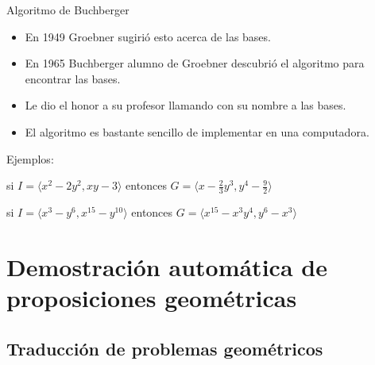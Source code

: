\documentclass[10pt]{beamer}
\newcommand{\gen}[1]{\ensuremath{\langle #1\rangle}}
\begin{document}
\begin{frame}{Algoritmo de Buchberger}
	\begin{itemize}
		\item En 1949 Groebner sugirió esto acerca de las bases.
		\item En 1965 Buchberger alumno de Groebner descubrió el algoritmo para encontrar las bases.
		\item Le dio el honor a su profesor llamando con su nombre a las bases.
		\item El algoritmo es bastante sencillo de implementar en una computadora.
	\end{itemize}

	\pause
	Ejemplos:
	
	si $I = \gen{x^2 - 2y^2, xy - 3}$ entonces $G=\gen{x - \frac{2}{3}y^3, y^4 - \frac{9}{2}}$
	
	si $I=\gen{x^3-y^6, x^{15}-y^{10}}$ entonces $G=\gen{x^{15} - x^3y^4, y^6 - x^3}$
\end{frame}

\section{Demostración automática de proposiciones geométricas}
\subsection{Traducción de problemas geométricos}
\end{document}
